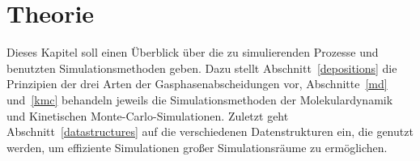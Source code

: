 \cleardoublepage
\chapter{Theorie}
\label{theory}

Dieses Kapitel soll einen Überblick über die zu simulierenden Prozesse und benutzten Simulationsmethoden geben.
Dazu stellt Abschnitt~\ref{depositions} die Prinzipien der drei Arten der Gasphasenabscheidungen vor, Abschnitte~\ref{md} und~\ref{kmc} behandeln jeweils die Simulationsmethoden der Molekulardynamik und Kinetischen Monte-Carlo-Simulationen.
Zuletzt geht Abschnitt~\ref{datastructures} auf die verschiedenen Datenstrukturen ein, die genutzt werden, um effiziente Simulationen großer Simulationsräume zu ermöglichen.


\clearpage

\clearpage

\clearpage

